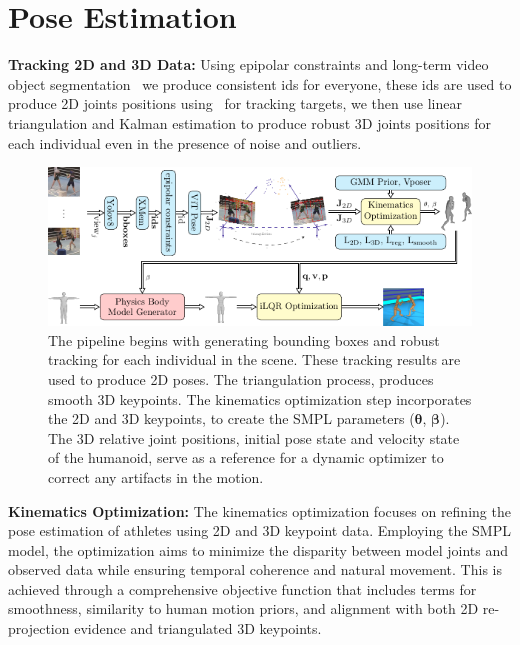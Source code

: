 \documentclass{egpubl}
\begin{document}
\section{Pose Estimation}


\textbf{Tracking 2D and 3D Data:} Using epipolar constraints and long-term video object segmentation~\cite{cheng2022xmem} we produce consistent ids for everyone, these ids are used to produce 2D joints positions using~\cite{xu2022vitpose} for tracking targets, we then use linear triangulation and Kalman estimation to produce robust 3D joints positions for each individual even in the presence of noise and outliers.   
\begin{figure}[!ht]
\includegraphics[width=0.73\linewidth]{pipeline.pdf}
 \centering
  \caption{The pipeline begins with generating bounding boxes  and robust tracking  for each individual in the scene. These tracking results are used to produce 2D poses. The triangulation process, produces smooth 3D keypoints. The kinematics optimization step incorporates the 2D and 3D keypoints, to create the SMPL parameters ($\mathbf{\theta}$, $\mathbf{\beta}$). The 3D relative joint positions, initial pose state  and velocity state of the humanoid, serve as a reference for a dynamic optimizer to correct any artifacts in the motion.}
  \label{fig:teaser}
\end{figure}


\textbf{Kinematics Optimization:} The kinematics optimization focuses on refining the pose estimation of athletes using 2D and 3D keypoint data. Employing the SMPL model, the optimization aims to minimize the disparity between model joints and observed data while ensuring temporal coherence and natural movement. This is achieved through a comprehensive objective function that includes terms for smoothness, similarity to human motion priors, and alignment with both 2D re-projection evidence and triangulated 3D keypoints.
\end{document}
